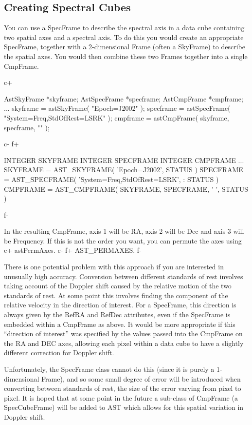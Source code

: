 \documentclass[twoside,11pt]{starlink}
\begin{document}
\subsection{\label{ss:creatingspectralcubes}Creating Spectral Cubes}
You can use a SpecFrame to describe the spectral axis in a data cube
containing two spatial axes and a spectral axis. To do this you would
create an appropriate SpecFrame, together with a 2-dimensional Frame
(often a SkyFrame) to describe the spatial axes. You would then combine
these two Frames together into a single CmpFrame.

c+
\small
\begin{terminalv}
AstSkyFrame *skyframe;
AstSpecFrame *specframe;
AstCmpFrame *cmpframe;
...
skyframe = astSkyFrame( "Epoch=J2002" );
specframe = astSpecFrame( "System=Freq,StdOfRest=LSRK" );
cmpframe = astCmpFrame( skyframe, specframe, "" );
\end{terminalv}
\normalsize
c-
f+
\small
\begin{terminalv}
      INTEGER SKYFRAME
      INTEGER SPECFRAME
      INTEGER CMPFRAME
      ...
      SKYFRAME = AST_SKYFRAME( 'Epoch=J2002', STATUS )
      SPECFRAME = AST_SPECFRAME( 'System=Freq,StdOfRest=LSRK',
     :                           STATUS )
      CMPFRAME = AST_CMPFRAME( SKYFRAME, SPECFRAME, ' ', STATUS )
\end{terminalv}
\normalsize
f-

In the resulting CmpFrame, axis 1 will be RA, axis 2 will be Dec and axis
3 will be Frequency. If this is not the order you want, you can permute
the axes using
c+
astPermAxes.
c-
f+
AST\_PERMAXES.
f-

There is one potential problem with this approach if you are interested in
unusually high accuracy. Conversion between different standards of rest
involves taking account of the Doppler shift caused by the relative
motion of the two standards of rest. At some point this involves finding
the component of  the relative velocity in the direction of interest.
For a SpecFrame, this direction is always given by the RefRA and RefDec
attributes, even if the SpecFrame is embedded within a CmpFrame as above.
It would be more appropriate if this ``direction of interest'' was
specified by the values passed into the CmpFrame on the RA and DEC axes,
allowing each pixel within a data cube to have a slightly different
correction for Doppler shift.

Unfortunately, the SpecFrame class cannot do this (since it is purely a
1-dimensional Frame), and so some small degree of error will be
introduced when converting between standards of rest, the size of the
error varying from pixel to pixel. It is hoped that at some point in the
future a sub-class of CmpFrame (a SpecCubeFrame) will be added to AST which
allows for this spatial variation in Doppler shift.
\end{document}
